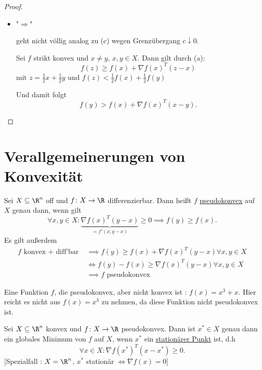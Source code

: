 \begin{proof}
\begin{itemize}[label=]
\begin{itemize}[label=]
 \item "$\Rightarrow$"

 geht nicht völlig analog zu (c) wegen Grenzübergang $c \downarrow 0$.

 Sei $f$ strikt konvex und $x\neq y$, $x,y \in X$. Dann gilt durch (a):
\[
	f(z) \geq f(x) + \nabla f(x)^{T}(z-x)
\] 
$  \text{mit }z=\frac{1}{2}x + \frac{1}{2}y \text{ und } f(z) < \frac{1}{2}f(x) + \frac{1}{2}f(y)$ 

Und damit folgt
\[
	f(y) > f(x) + \nabla f(x)^{T}(x-y)
.\] 
	\end{itemize}
\end{itemize}

\end{proof}

\section*{Verallgemeinerungen von Konvexität}%
\label{sec:Verallgemeinerungen von Konvexität}

\begin{definition}
\label{thm:pseudokonvexität}
	Sei $X \subseteq \R^{n}$ off und $f \colon X \rightarrow \R $ differenzierbar. Dann heißt $f$ \underline{pseudokonvex} auf $X$ genau dann, wenn gilt 
	\[
		\forall x,y \in X \colon \underbrace{\nabla f(x)^{T}(y-x)}_{=f'(x; y-x)} \geq 0 \implies f(y) \geq f(x)
	.\] 
Es gilt außerdem
\begin{align*}
	f \text{ konvex + diff'bar } & \implies f(y) \geq f(x) + \nabla f(x)^{T}(y-x) \forall x,y \in X \\
								 & \iff f(y) - f(x) \geq \nabla f(x)^{T}(y-x) \forall x,y \in X \\
								 &\implies f \text{ pseudokonvex}
\end{align*}
\end{definition}


\begin{beispiel}
\label{thm:bsppseudokonvex}
Eine Funktion $f$, die pseudokonvex, aber nicht konvex ist : $f(x) = x^{3} + x$. Hier reicht es nicht aus $f(x)=x^{3}$ zu nehmen, da diese Funktion nicht pseudokonvex ist.
\end{beispiel}

\begin{satz}
\label{thm:stationäresatz}
	Sei $X \subseteq \R^{n}$ konvex und $f \colon X \rightarrow \R $ pseudokonvex. Dann ist ${x}^{*} \in X$ genau dann ein globales Minimum von $f$ auf $X$, wenn ${x}^{*}$ ein \underline{stationärer Punkt} ist, d.h
	\[
		\forall x \in X \colon \nabla f({x}^{*})^{T}(x-{x}^{*}) \geq 0
	.\]
	[Spezialfall : $X = \R^{n}$, ${x}^{*}$ stationär $\iff \nabla f(x) = 0$]
\end{satz}

